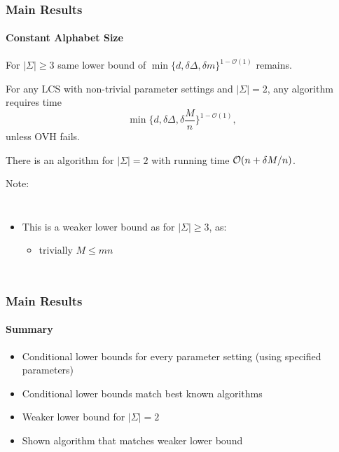 \begin{frame}
\frametitle{Main Results}
\framesubtitle{Constant Alphabet Size}

\begin{theorem}
For $|\Sigma| \geq 3$ same lower bound of $\min\{d, \delta \Delta, \delta m\}^{1 - \mathcal{O}(1)}$ remains.
\end{theorem}

\pause

\begin{theorem}
For any LCS with non-trivial parameter settings and $|\Sigma| = 2$, any algorithm requires time 
\[
\min\{d, \delta \Delta, \delta\frac{M}{n}\}^{1 - \mathcal{O}(1)},
\] 
unless OVH fails.

There is an algorithm for $|\Sigma| = 2$ with running time $\mathcal{O}(n + \delta M / n)$.
\end{theorem}

\pause

\begin{exampleblock}{Note:}
\vspace{-1ex}
\begin{columns}
	\begin{itemize}
		\item This is a weaker lower bound as for $|\Sigma| \geq 3$, as:
		\begin{itemize}
			\item<4-> trivially $M \leq mn$ \visible<5->{$\Rightarrow \frac{M}{n} \leq m \Rightarrow \delta \frac{M}{n} \leq \delta m$}
		\end{itemize}
	\end{itemize}
\end{columns}
\end{exampleblock}

\end{frame}







\begin{frame}
\frametitle{Main Results}
\framesubtitle{Summary}
\Large

\begin{itemize}
	\item Conditional lower bounds for every parameter setting (using specified parameters)
	\pause
	\item Conditional lower bounds match best known algorithms
	\pause
	\item Weaker lower bound for $|\Sigma| = 2$
	\pause
	\item Shown algorithm that matches weaker lower bound
\end{itemize}

\end{frame}
